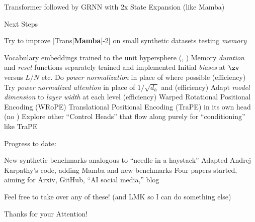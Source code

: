 \begin{slide}[\slideopts,toc={TransMamba}]{Transformer followed by GRNN with 2x State Expansion (like Mamba)}
\vspace{-1.6em}
\vspace{-2em}
\maybepause
{} %
\end{slide}

\begin{slide}[\slideopts,toc={Plan}]{Next Steps}
  \vspace{-1em}
  \begin{itemize}
    \mpitem Try to improve [Trans]\textbf{Mamba}[-2] on small synthetic datasets testing \emph{memory}
    \begin{itemize}
      \mpitem Vocabulary embeddings trained to the unit hypersphere (\eg, )
      \mpitem Memory \emph{duration} and \emph{reset} functions separately trained and implemented
      \mpitem Initial \emph{biases} at $\zv$ versus $L/N$ etc.
      \mpitem Do \emph{power normalization} in place of  where possible (efficiency)
      \mpitem Try \emph{power normalized attention} in place of $1/\sqrt{d_h}$ and  (efficiency)
      \mpitem Adapt \emph{model dimension} to \emph{layer width} at each level (efficiency)
      \mpitem Warped Rotational Positional Encoding (WRoPE)
      \mpitem Translational Positional Encoding (TraPE) in its own head (no )
      \mpitem Explore other ``Control Heads'' that flow along purely for ``conditioning'' like TraPE
    \end{itemize}
    \mpitem Progress to date:
    \begin{itemize}
      \mpitem New synthetic benchmarks analogous to ``needle in a haystack''
      \mpitem Adapted Andrej Karpathy's  code, adding Mamba and new benchmarks
      \mpitem Four papers started, aiming for Arxiv, GitHub, ``AI social media,'' blog
    \end{itemize}
    \mpitem Feel free to take over any of these! (and LMK so I can do something else)
  \end{itemize}
\end{slide}

\begin{slide}[\slideopts,toc={Hypersphere}]{Thanks for your Attention!}
\vspace{-1em}
\end{slide}

